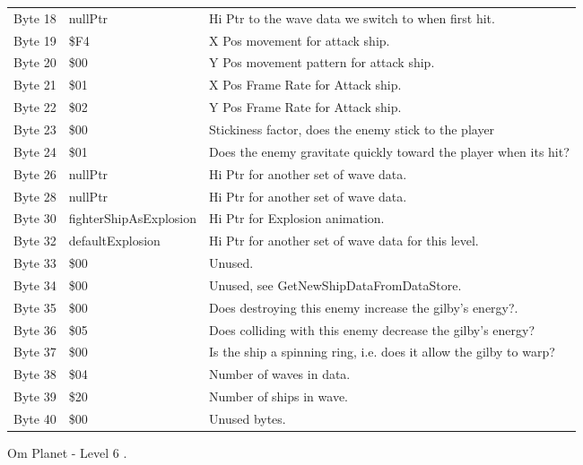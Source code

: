 \begin{figure}[H]
{\begin{adjustbox}{width=12cm}
\begin{tabular}{lll}
 Byte 18 & nullPtr                & Hi Ptr to the wave data we switch to when first hit.               \\
 Byte 19 & \$F4                    & X Pos movement for attack ship.                                    \\
 Byte 20 & \$00                    & Y Pos movement pattern for attack ship.                            \\
 Byte 21 & \$01                    & X Pos Frame Rate for Attack ship.                                  \\
 Byte 22 & \$02                    & Y Pos Frame Rate for Attack ship.                                  \\
 Byte 23 & \$00                    & Stickiness factor, does the enemy stick to the player              \\
 Byte 24 & \$01                    & Does the enemy gravitate quickly toward the player when its hit?   \\
 Byte 26 & nullPtr                & Hi Ptr for another set of wave data.                               \\
 Byte 28 & nullPtr                & Hi Ptr for another set of wave data.                               \\
 Byte 30 & fighterShipAsExplosion & Hi Ptr for Explosion animation.                                    \\
 Byte 32 & defaultExplosion       & Hi Ptr for another set of wave data for this level.                \\
 Byte 33 & \$00                    & Unused.                                                            \\
 Byte 34 & \$00                    & Unused, see GetNewShipDataFromDataStore.                           \\
 Byte 35 & \$00                    & Does destroying this enemy increase the gilby's energy?.           \\
 Byte 36 & \$05                    & Does colliding with this enemy decrease the gilby's energy?        \\
 Byte 37 & \$00                    & Is the ship a spinning ring, i.e. does it allow the gilby to warp? \\
 Byte 38 & \$04                    & Number of waves in data.                                           \\
 Byte 39 & \$20                    & Number of ships in wave.                                           \\
 Byte 40 & \$00                    & Unused bytes.                                                      \\
\bottomrule
\end{tabular}

  \end{adjustbox}

  }\caption*{Om Planet - Level 6
.}
\end{figure}

